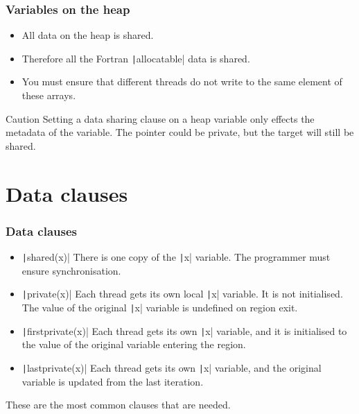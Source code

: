 \documentclass{beamer}
\begin{document}
\begin{frame}
\frametitle{Variables on the heap}
\begin{itemize}
  \item All data on the heap is shared.
  \item Therefore all the Fortran \texttt|allocatable| data is shared.
  \item You must ensure that different threads do not write to the same element of these arrays.
\end{itemize}

\begin{alertblock}{Caution}
Setting a data sharing clause on a heap variable only effects the metadata of the variable.
The pointer could be private, but the target will still be shared.
\end{alertblock}
\end{frame}

\section{Data clauses}
\begin{frame}
\frametitle{Data clauses}
\begin{itemize}
  \item \texttt|shared(x)|
    There is one copy of the \texttt|x| variable. The programmer must ensure synchronisation.
  \item \texttt|private(x)|
    Each thread gets its own local \texttt|x| variable. It is not initialised. The value of the original \texttt|x| variable is undefined on region exit.
  \item \texttt|firstprivate(x)|
    Each thread gets its own \texttt|x| variable, and it is initialised to the value of the original variable entering the region.
  \item \texttt|lastprivate(x)|
    Each thread gets its own \texttt|x| variable, and the original variable is updated from the last iteration.
\end{itemize}

These are the most common clauses that are needed.
\end{frame}
\end{document}

